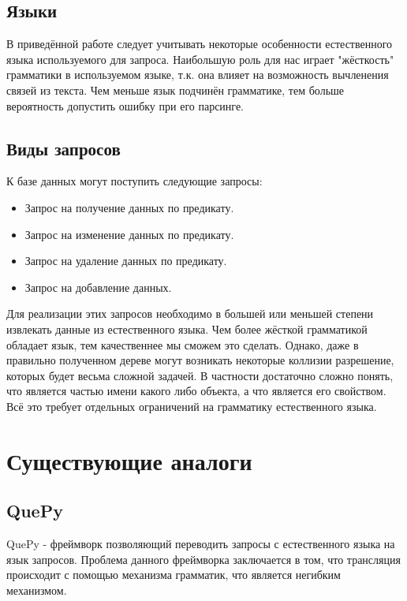 \subsection{Языки}
В приведённой работе следует учитывать некоторые особенности естественного языка используемого для запроса. Наибольшую роль для нас играет "жёсткость" грамматики в используемом языке, т.к. она влияет на возможность вычленения связей из текста. Чем меньше язык подчинён грамматике, тем больше вероятность допустить ошибку при его парсинге.
\subsection{Виды запросов}
К базе данных могут поступить следующие запросы:
\begin{itemize}
\item Запрос на получение данных по предикату.
\item Запрос на изменение данных по предикату.
\item Запрос на удаление данных по предикату.
\item Запрос на добавление данных.
\end{itemize}
Для реализации этих запросов необходимо в большей или меньшей степени извлекать данные из естественного языка. Чем более жёсткой грамматикой обладает язык, тем качественнее мы сможем это сделать. Однако, даже в правильно полученном дереве могут возникать некоторые коллизии разрешение, которых будет весьма сложной задачей. В частности достаточно сложно понять, что является частью имени какого либо объекта, а что является его свойством.
Всё это требует отдельных ограничений на грамматику естественного языка.

\section{Существующие аналоги}
\subsection{QuePy}
QuePy - фреймворк позволяющий переводить запросы с естественного языка на язык запросов. Проблема данного фреймворка заключается в том, что трансляция происходит с помощью механизма грамматик, что является негибким механизмом.

